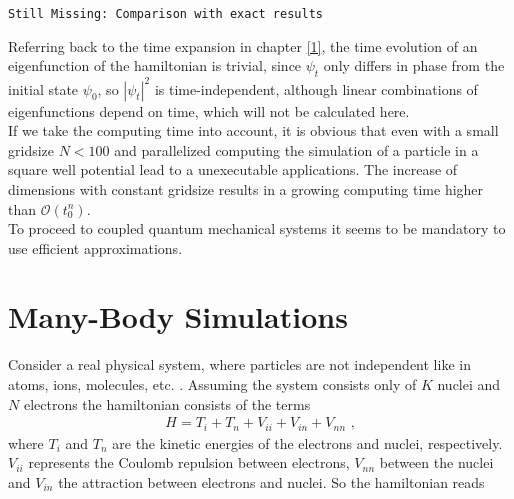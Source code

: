 \documentclass[10pt,a4paper]{article} %
\begin{document}
\begin{lstlisting}
Still Missing: Comparison with exact results
\end{lstlisting}

Referring back to the time expansion in chapter \ref{1}, the time evolution of an eigenfunction of the hamiltonian is trivial, since $\psi_t$ only differs in phase from the initial state $\psi_0$, so ${|\psi_t|}^2$ is time-independent, although linear combinations of eigenfunctions depend on time, which will not be calculated here.\\

If we take the computing time into account, it is obvious that even with a small gridsize $N<100$ and parallelized computing the simulation of a particle in a square well potential lead to a unexecutable applications. The increase of dimensions with constant gridsize results in a growing computing time higher than $\mathcal O (t_0^n)$. \\

To proceed to coupled quantum mechanical systems it seems to be mandatory to use efficient approximations.




    \section{Many-Body Simulations}
    
    Consider a real physical system, where particles are not independent like in atoms, ions, molecules, etc. . Assuming the system consists only of $K$ nuclei and $N$ electrons the hamiltonian consists of the terms
\begin{align*}
    H = T_i + T_n+ V_{ii} + V_{in} + V_{nn} \text{ ,}
\end{align*} 
    where $T_i $ and $T_n$ are the kinetic energies of the electrons and nuclei, respectively. $V_{ii}$ represents the Coulomb repulsion between electrons, $V_{nn}$ between the nuclei and $V_{in}$  the attraction between electrons and nuclei. So the hamiltonian reads
    
\end{document}
